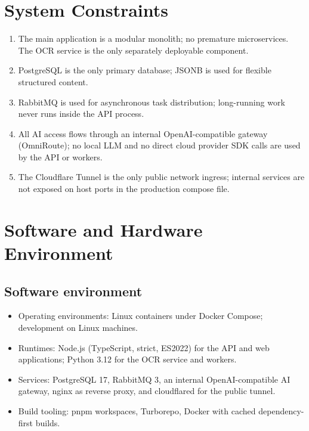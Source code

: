 \section{System Constraints}

\begin{enumerate}
  \item The main application is a modular monolith; no premature
        microservices. The OCR service is the only separately deployable
        component.
  \item PostgreSQL is the only primary database; JSONB is used for flexible
        structured content.
  \item RabbitMQ is used for asynchronous task distribution; long-running
        work never runs inside the API process.
  \item All AI access flows through an internal OpenAI-compatible gateway
        (OmniRoute); no local LLM and no direct cloud provider SDK calls are
        used by the API or workers.
  \item The Cloudflare Tunnel is the only public network ingress; internal
        services are not exposed on host ports in the production compose file.
\end{enumerate}

\section{Software and Hardware Environment}

\subsection{Software environment}

\begin{itemize}
  \item Operating environments: Linux containers under Docker Compose;
        development on Linux machines.
  \item Runtimes: Node.js (TypeScript, strict, ES2022) for the API and web
        applications; Python 3.12 for the OCR service and workers.
  \item Services: PostgreSQL 17, RabbitMQ 3, an internal OpenAI-compatible AI
        gateway, nginx as reverse proxy, and cloudflared for the public
        tunnel.
  \item Build tooling: pnpm workspaces, Turborepo, Docker with cached
        dependency-first builds.
\end{itemize}

